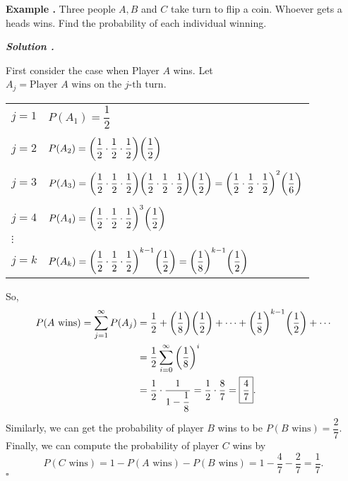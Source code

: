 \documentclass[12pt, a4paper]{article}
\newcounter{index}[subsection]
\newenvironment*{eg}{\begin{framed}\par\noindent\textbf{Example \thesubsection.\stepcounter{index}\theindex}}{\par\end{framed}}
\newcounter{nprf}[subsection]
\newenvironment*{sol}{\par\indent\textbf{\textit{Solution \stepcounter{nprf}\thenprf.}}\par}{\hfill{$\square$}\par}
\begin{document}
\begin{eg}{}
	Three people $A,B$ and $C$ take turn to flip a coin. Whoever gets a heads wins. Find the probability of each individual winning. 
	\begin{sol}
		First consider the case when Player $A$ wins. Let $A_j=\text{Player }A\text{ wins on the }j\text{-th turn}$. 
		\begin{center}\begin{tabular}{ll}
		$j=1$&$P(A_1)=\dfrac{1}{2}$\\\\
		$j=2$&$P(A_2)=\qty(\dfrac{1}{2}\cdot\dfrac{1}{2}\cdot\dfrac{1}{2})\qty(\dfrac{1}{2})$\\\\
		$j=3$&$P(A_3)=\qty(\dfrac{1}{2}\cdot\dfrac{1}{2}\cdot\dfrac{1}{2})\qty(\dfrac{1}{2}\cdot\dfrac{1}{2}\cdot\dfrac{1}{2})\qty(\dfrac{1}{2})=\qty(\dfrac{1}{2}\cdot\dfrac{1}{2}\cdot\dfrac{1}{2})^2\qty(\dfrac{1}{6})$\\\\
		$j=4$&$P(A_4)=\qty(\dfrac{1}{2}\cdot\dfrac{1}{2}\cdot\dfrac{1}{2})^3\qty(\dfrac{1}{2})$\\
		$\vdots$&\\
		$j=k$&$P(A_k)=\qty(\dfrac{1}{2}\cdot\dfrac{1}{2}\cdot\dfrac{1}{2})^{k-1}\qty(\dfrac{1}{2})=\qty(\dfrac{1}{8})^{k-1}\qty(\dfrac{1}{2})$
		\end{tabular}\end{center}	
		So, \[\begin{aligned}P(A\text{ wins})=\sum_{j=1}^\infty P(A_j)&=\dfrac{1}{2}+\qty(\dfrac{1}{8})\qty(\dfrac{1}{2})+\cdots+\qty(\dfrac{1}{8})^{k-1}\qty(\dfrac{1}{2})+\cdots\\&=\dfrac{1}{2}\sum_{i=0}^\infty\qty(\dfrac{1}{8})^i\\&=\dfrac{1}{2}\cdot\dfrac{1}{1-\dfrac{1}{8}}=\dfrac{1}{2}\cdot\dfrac{8}{7}=\boxed{\dfrac{4}{7}}.\end{aligned}\]
		Similarly, we can get the probability of player $B$ wins to be $P(B\text{ wins})=\dfrac{2}{7}$. Finally, we can compute the probability of player $C$ wins by \[P(C\text{ wins})=1-P(A\text{ wins})-P(B\text{ wins})=1-\dfrac{4}{7}-\dfrac{2}{7}=\dfrac{1}{7}.\]
	\end{sol}
\end{eg}
\end{document}
